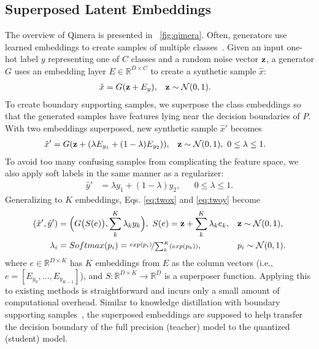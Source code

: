 \documentclass{article}
\newcommand{\aname}{Qimera\xspace}
\begin{document}
\subsection{Superposed Latent Embeddings}
The overview of \aname is presented in \figurename~\ref{fig:qimera}.
Often, generators use learned embeddings to create samples of multiple classes~\cite{acgan, stylegan}.
Given an input one-hot label $y$ representing one of $C$ classes and a random noise vector $\bf{z}$, a generator $G$ uses an embedding layer $E \in \mathbb{R}^{D\times C}$ to create a synthetic sample $\hat{x}$:
\begin{align}
    \hat x &= G({\bf z} + E_y), && {\bf z} \sim \mathcal{N}(0,1).
    \label{eq:onex}
\end{align}
To create boundary supporting samples, we superpose the class embeddings so that the generated samples 
have features lying near the decision boundaries of $P$.
With two embeddings superposed, new synthetic sample $\hat{x}'$ becomes 
\begin{align}
    \hat x' &= G({\bf z} + (\lambda E_{y_1}+(1-\lambda)E_{y_2})), && {\bf z} \sim \mathcal{N}(0,1),\ 0 \leq \lambda \leq 1.
    \label{eq:twox}
\end{align}
To avoid too many confusing samples from complicating the feature space, we also apply soft labels in the same manner as a regularizer:
\begin{align}
    \hat y' &= \lambda y_1 +(1-\lambda)y_2, && 0 \leq \lambda \leq 1.
    \label{eq:twoy}
\end{align}
Generalizing to $K$ embeddings, Eqs. \ref{eq:twox} and \ref{eq:twoy} become
\begin{align}
    \label{eq:manyx}
    (\hat x', \hat y') &= \Big( G\big(S(e)\big), \sum_k^K \lambda_k y_k\Big),  
\,\,S(e) = {\bf z} + \sum_k^K \lambda_k e_k, && {\bf z} \sim \mathcal{N}(0,1),\\
    \lambda_i &= Softmax(p_i) = \nicefrac{exp(p_i)}{\sum_k^K(exp(p_k))}, && p_i \sim \mathcal{N}(0,1).
\end{align}
where $e \in \mathbb{R}^{D\times K}$ has $K$ embeddings from $E$ as the column vectors 
(i.e., $e =[E_{y_0},\dots,E_{y_{K-1}}]$), 
and $S : \mathbb{R}^{D\times K} \rightarrow \mathbb{R}^D$ is a superposer function. Applying this to existing methods is straightforward and incurs only a small amount of computational overhead.
Similar to knowledge distillation with boundary supporting samples~\cite{heo2019knowledge,dong2020adversarial}, the superposed embeddings are supposed to help transfer the decision boundary of the full precision (teacher) model to the quantized (student) model. 
\end{document}
